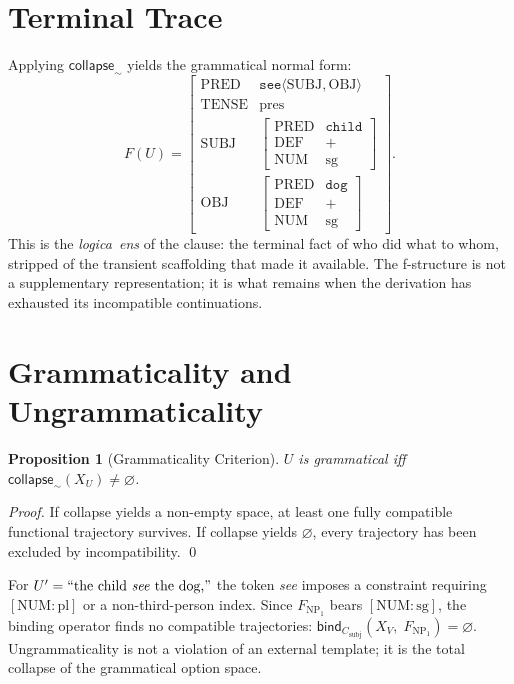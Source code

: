 \documentclass[12pt, oneside]{amsbook}
\theoremstyle{plain}
\newtheorem{proposition}[theorem]{Proposition}
\theoremstyle{definition}
\theoremstyle{remark}
\newcommand{\collapseop}{\mathsf{collapse}}
\newcommand{\bind}{\mathsf{bind}}
\newcommand{\tequiv}{\sim}
\newcommand{\ens}{\textit{logica~ens}}
\newcommand{\feat}[1]{\left[\begin{array}{ll}#1\end{array}\right]}
\begin{document}
\section{Terminal Trace}
\label{sec:parse:terminal}

Applying $\collapseop_{\tequiv}$ yields the grammatical normal form:
\[
  F(U) = \feat{
    \mathrm{PRED}  & \texttt{see}\langle\mathrm{SUBJ},\mathrm{OBJ}\rangle \\
    \mathrm{TENSE} & \mathrm{pres} \\
    \mathrm{SUBJ}  &
      \left[\begin{smallmatrix}
        \mathrm{PRED} & \texttt{child}\\
        \mathrm{DEF}  & + \\
        \mathrm{NUM}  & \mathrm{sg}
      \end{smallmatrix}\right] \\[4pt]
    \mathrm{OBJ}   &
      \left[\begin{smallmatrix}
        \mathrm{PRED} & \texttt{dog}\\
        \mathrm{DEF}  & + \\
        \mathrm{NUM}  & \mathrm{sg}
      \end{smallmatrix}\right]
  }.
\]
This is the \ens{} of the clause: the terminal fact of who did what to whom,
stripped of the transient scaffolding that made it available. The f-structure is
not a supplementary representation; it is what remains when the derivation has
exhausted its incompatible continuations.

\section{Grammaticality and Ungrammaticality}
\label{sec:parse:grammaticality}

\begin{proposition}[Grammaticality Criterion]
\label{prop:grammaticality}
  $U$ is grammatical iff $\collapseop_{\tequiv}(X_U) \neq \varnothing$.
\end{proposition}

\begin{proof}
If collapse yields a non-empty space, at least one fully compatible functional
trajectory survives. If collapse yields $\varnothing$, every trajectory has
been excluded by incompatibility. \qed
\end{proof}

For $U' = \text{``the child \textit{see} the dog,''}$ the token \textit{see}
imposes a constraint requiring $[\mathrm{NUM}:\mathrm{pl}]$ or a non-third-person
index. Since $F_{\mathrm{NP}_1}$ bears $[\mathrm{NUM}:\mathrm{sg}]$, the binding
operator finds no compatible trajectories: $\bind_{C_{\mathrm{subj}}}(X_V,\;
F_{\mathrm{NP}_1}) = \varnothing$. Ungrammaticality is not a violation of an
external template; it is the total collapse of the grammatical option space.
\end{document}
